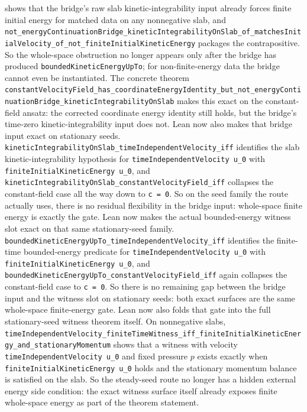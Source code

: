 \documentclass[11pt]{article}
\begin{document}
shows that the bridge's raw slab kinetic-integrability input already forces
finite initial energy for matched data on any nonnegative slab, and
\texttt{not\_energyContinuationBridge\_kineticIntegrabilityOnSlab\_of\_matchesInitialVelocity\_of\_not\_finiteInitialKineticEnergy}
packages the contrapositive.  So the whole-space obstruction no longer appears
only after the bridge has produced \texttt{boundedKineticEnergyUpTo}; for
non-finite-energy data the bridge cannot even be instantiated.  The concrete
theorem
\texttt{constantVelocityField\_has\_coordinateEnergyIdentity\_but\_not\_energyContinuationBridge\_kineticIntegrabilityOnSlab}
makes this exact on the constant-field ansatz: the corrected coordinate energy
identity still holds, but the bridge's time-zero kinetic-integrability input
does not.
Lean now also makes that bridge input exact on stationary seeds.
\texttt{kineticIntegrabilityOnSlab\_timeIndependentVelocity\_iff} identifies
the slab kinetic-integrability hypothesis for \texttt{timeIndependentVelocity
\;u\_0} with \texttt{finiteInitialKineticEnergy \;u\_0}, and
\texttt{kineticIntegrabilityOnSlab\_constantVelocityField\_iff} collapses the
constant-field case all the way down to \texttt{c = 0}.  So on the seed family
the route actually uses, there is no residual flexibility in the bridge input:
whole-space finite energy is exactly the gate.
Lean now makes the actual bounded-energy witness slot exact on that same
stationary-seed family.  \texttt{boundedKineticEnergyUpTo\_timeIndependentVelocity\_iff}
identifies the finite-time bounded-energy predicate for
\texttt{timeIndependentVelocity \;u\_0} with
\texttt{finiteInitialKineticEnergy \;u\_0}, and
\texttt{boundedKineticEnergyUpTo\_constantVelocityField\_iff} again collapses
the constant-field case to \texttt{c = 0}.  So there is no remaining gap
between the bridge input and the witness slot on stationary seeds: both exact
surfaces are the same whole-space finite-energy gate.
Lean now also folds that gate into the full stationary-seed witness theorem
itself.  On nonnegative slabs,
\texttt{timeIndependentVelocity\_finiteTimeWitness\_iff\_finiteInitialKineticEnergy\_and\_stationaryMomentum}
shows that a witness with velocity \texttt{timeIndependentVelocity \;u\_0} and
fixed pressure \(p\) exists exactly when \texttt{finiteInitialKineticEnergy
\;u\_0} holds and the stationary momentum balance is satisfied on the slab.
So the steady-seed route no longer has a hidden external energy side condition:
the exact witness surface itself already exposes finite whole-space energy as
part of the theorem statement.
\end{document}
